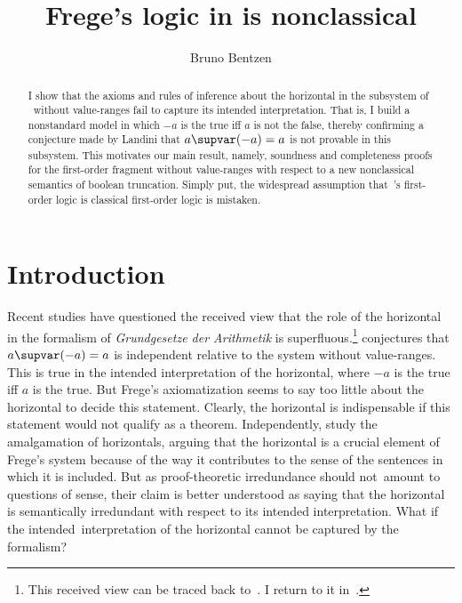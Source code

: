\documentclass{preprint}
\title{Frege's logic in {\gga} is nonclassical}
\author{Bruno Bentzen}
\renewcommand{\to}{\supvar}
\begin{document}
	
\maketitle

\begin{abstract}
	I show that the axioms and rules of inference about the horizontal in the subsystem of \gga~without value-ranges fail to capture its intended interpretation. That is, I build a nonstandard model in which $-a$ is the true iff $a$ is not the false, thereby confirming a conjecture made by Landini that $a \to (-a) = a$ is not provable in this subsystem. This motivates our main result, namely, soundness and completeness proofs for the first-order fragment without value-ranges with respect to a new nonclassical semantics of boolean truncation. Simply put, the widespread assumption that~\gga's first-order logic is classical first-order logic is mistaken.
\end{abstract}


\nocite{frege1962grundgesetze}

\section{Introduction} \label{intro}

Recent studies have questioned the received view that the role of the horizontal in the formalism of \textit{Grundgesetze der Arithmetik} is superfluous.\footnote{
	This received view can be traced back to~\citet[p.~315]{dummett1973fregelanguage}. I return to it in~. } 
\cite{landini2022stipulations} conjectures that $a \to (-a)=a$ is independent relative to the system without value-ranges. 
This is true in the intended interpretation of the horizontal, where $-a$ is the true iff $a$ is the true. But Frege's axiomatization seems to say too little about the horizontal to decide this statement. 
Clearly, the horizontal is indispensable if this statement would not qualify as a theorem. 
Independently, \cite{bellucci2023frege} study the amalgamation of horizontals, arguing that the horizontal is a crucial element of Frege's system because of the way it contributes to the sense of the sentences in which it is included. 
But as proof-theoretic irredundance should not~amount to questions of sense, their claim is better understood as saying that the horizontal is semantically irredundant with respect to its intended interpretation. What if the intended~interpretation of the horizontal cannot be captured by the formalism? 
\end{document}
